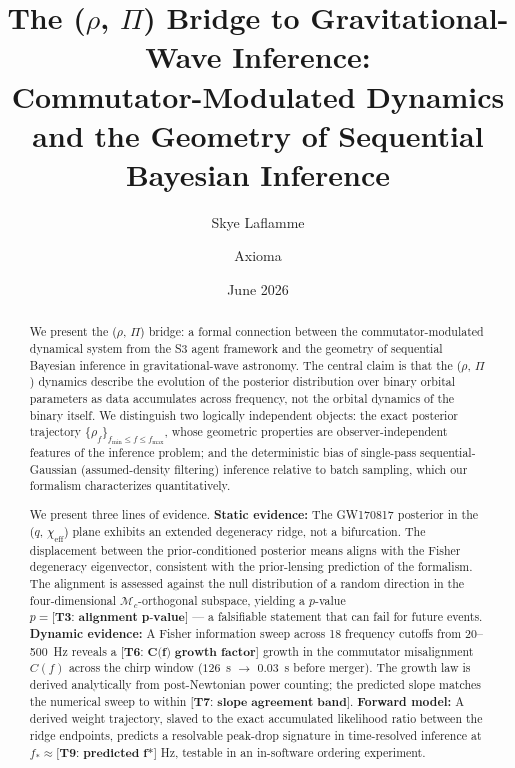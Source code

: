 \documentclass[twocolumn,prd,showpacs,superscriptaddress]{revtex4-2}
\newcommand{\manifest}[1]{\textbf{[#1]}}
\begin{document}
\title{The ($\rho$, $\Pi$) Bridge to Gravitational-Wave Inference: \\
Commutator-Modulated Dynamics and the Geometry of Sequential Bayesian Inference}

\author{Skye Laflamme}
\author{Axioma}

\date{June 2026}

\begin{abstract}
We present the ($\rho$, $\Pi$) bridge: a formal connection between the
commutator-modulated dynamical system from the S3 agent framework and
the geometry of sequential Bayesian inference in gravitational-wave
astronomy.  The central claim is that the ($\rho$, $\Pi$) dynamics
describe the evolution of the posterior distribution over binary
orbital parameters as data accumulates across frequency, not the
orbital dynamics of the binary itself.  We distinguish two logically
independent objects: the exact posterior trajectory
$\{\rho_f\}_{f_{\text{min}}\le f\le f_{\text{max}}}$, whose geometric
properties are observer-independent features of the inference problem;
and the deterministic bias of single-pass sequential-Gaussian
(assumed-density filtering) inference relative to batch sampling, which
our formalism characterizes quantitatively.

We present three lines of evidence.  \textbf{Static evidence:} The
GW170817 posterior in the ($q$, $\chi_{\text{eff}}$) plane exhibits an
extended degeneracy ridge, not a bifurcation.  The displacement between
the prior-conditioned posterior means aligns with the Fisher
degeneracy eigenvector, consistent with the prior-lensing prediction
of the formalism.  The alignment is assessed against the null
distribution of a random direction in the four-dimensional
$\mathcal{M}_c$-orthogonal subspace, yielding a $p$-value
$p = \manifest{T3: alignment p-value}$
--- a falsifiable statement that can fail for future events.
\textbf{Dynamic evidence:} A Fisher information sweep across 18
frequency cutoffs from 20--500~Hz reveals a
$\manifest{T6: C(f) growth factor}$ growth in the commutator
misalignment $C(f)$ across the chirp window
($126$~s $\rightarrow$ $0.03$~s before merger).  The growth law is
derived analytically from post-Newtonian power counting; the
predicted slope matches the numerical sweep to within
$\manifest{T7: slope agreement band}$.
\textbf{Forward model:} A derived weight trajectory, slaved to the
exact accumulated likelihood ratio between the ridge endpoints, predicts
a resolvable peak-drop signature in time-resolved inference at
$f_* \approx \manifest{T9: predicted f*}$ Hz, testable in an
in-software ordering experiment.


\end{abstract}
\end{document}

